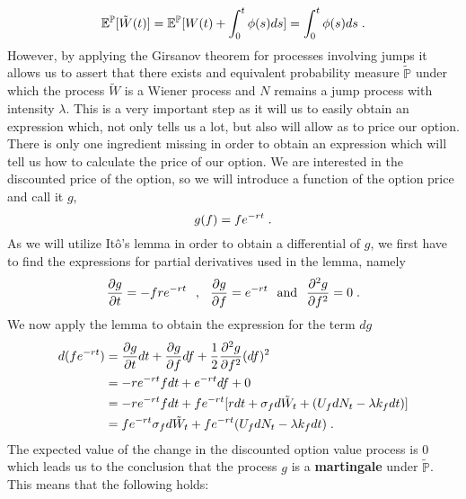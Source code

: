 \documentclass[times, utf8, diplomski]{fer}
\begin{document}
\begin{equation*}
	\mathbb{E}^{\mathbb{P}}[\tilde{W}(t)] = \mathbb{E}^{\mathbb{P}}[W(t) + \int_0^t \phi(s) ds] = \int_0^t \phi(s) ds \hspace{0.1cm}.
\end{equation*}
However, by applying the Girsanov theorem for processes involving jumps it allows us to assert that there exists and equivalent probability measure $\tilde{\mathbb{P}}$ under which the process $\tilde{W}$ is a Wiener process and $N$ remains a jump process with intensity $\lambda$. This is a very important step as it will us to easily obtain an expression which, not only tells us a lot, but also will allow as to price our option. There is only one ingredient missing in order to obtain an expression which will tell us how to calculate the price of our option. We are interested in the discounted price of the option, so we will introduce a function of the option price and call it $g$, $$ g(f) =  fe^{-rt}  \hspace{0.1cm}.$$ As we will utilize It\^{o}'s lemma in order to obtain a differential of $g$, we first have to find the expressions for partial derivatives used in the lemma, namely
$$
	\frac{\partial g}{\partial t} = -fre^{-rt} \hspace{0.25cm} , \hspace{0.25cm} \frac{\partial g}{\partial f} = e^{-rt} \hspace{0.25cm} \mbox{and} \hspace{0.25cm} \frac{\partial^2 g}{\partial f^2} = 0  \hspace{0.1cm}.
$$
We now apply the lemma to obtain the expression for the term $dg$
\begin{align*}
	d(fe^{-rt}) &= \frac{\partial g}{\partial t}dt + \frac{\partial g}{\partial f}df + \frac{1}{2}\frac{\partial^2 g}{\partial f^2}(df)^2 \\
				&= -re^{-rt}fdt + e^{-rt}df + 0 \\
				&= -re^{-rt}fdt + fe^{-rt}[r dt + \sigma_f d\tilde{W}_t + (U_fdN_t - \lambda k_f dt)] \\
				&= fe^{-rt}\sigma_f d\tilde{W}_t + fe^{-rt}(U_fdN_t-\lambda k_f dt) \hspace{0.1cm}.
\end{align*}
The expected value of the change in the discounted option value process is $0$ which leads us to the conclusion that the process $g$ is a \textbf{martingale} under $\tilde{\mathbb{P}}$. This means that the following holds: 
\end{document}
